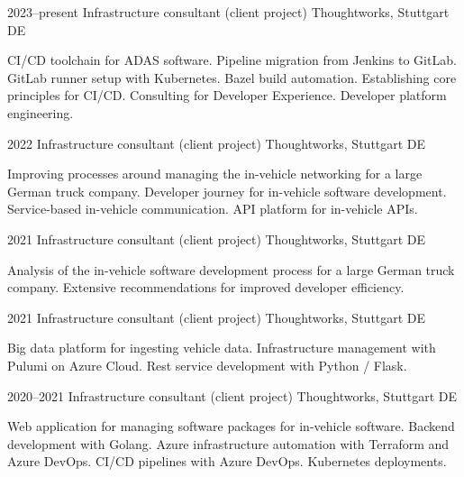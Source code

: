 \documentclass[]{friggeri-cv} %
\begin{document}
\begin{entrylist}
\entry
{2023--present}
{Infrastructure consultant (client project)}
{Thoughtworks, Stuttgart DE}
{CI/CD toolchain for ADAS software. Pipeline migration from Jenkins to GitLab. GitLab runner setup with Kubernetes. Bazel build automation. Establishing core principles for CI/CD. Consulting for Developer Experience. Developer platform engineering.

}
\end{entrylist}
\begin{entrylist}
\entry
{2022}
{Infrastructure consultant (client project)}
{Thoughtworks, Stuttgart DE}
{Improving processes around managing the in-vehicle networking for a large German truck company. Developer journey for in-vehicle software development. Service-based in-vehicle communication. API platform for in-vehicle APIs.

}
\end{entrylist}
\begin{entrylist}
\entry
{2021}
{Infrastructure consultant (client project)}
{Thoughtworks, Stuttgart DE}
{Analysis of the in-vehicle software development process for a large German truck company. Extensive recommendations for improved developer efficiency.

}
\end{entrylist}
\begin{entrylist}
\entry
{2021}
{Infrastructure consultant (client project)}
{Thoughtworks, Stuttgart DE}
{Big data platform for ingesting vehicle data. Infrastructure management with Pulumi on Azure Cloud. Rest service development with Python / Flask.

}
\end{entrylist}
\begin{entrylist}
\entry
{2020--2021}
{Infrastructure consultant (client project)}
{Thoughtworks, Stuttgart DE}
{Web application for managing software packages for in-vehicle software. Backend development with Golang. Azure infrastructure automation with Terraform and Azure DevOps. CI/CD pipelines with Azure DevOps. Kubernetes deployments.

}
\end{entrylist}
\end{document}
